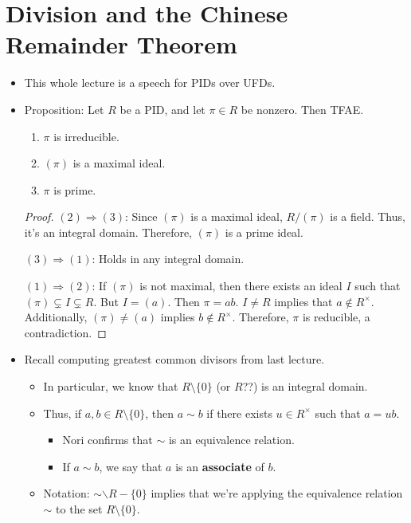 \documentclass[../notes.tex]{subfiles}
\begin{document}
\section{Division and the Chinese Remainder Theorem}
\begin{itemize}
    \item {}This whole lecture is a speech for PIDs over UFDs.
    \item Proposition: Let $R$ be a PID, and let $\pi\in R$ be nonzero. Then TFAE.
    \begin{enumerate}[label={(\arabic*)}]
        \item $\pi$ is irreducible.
        \item $(\pi)$ is a maximal ideal.
        \item $\pi$ is prime.
    \end{enumerate}
    \begin{proof}
        \underline{$(2)\Longrightarrow(3)$}: Since $(\pi)$ is a maximal ideal, $R/(\pi)$ is a field. Thus, it's an integral domain. Therefore, $(\pi)$ is a prime ideal.\par
        \underline{$(3)\Longrightarrow(1)$}: Holds in any integral domain.\par
        \underline{$(1)\Longrightarrow(2)$}: If $(\pi)$ is not maximal, then there exists an ideal $I$ such that $(\pi)\subsetneq I\subsetneq R$. But $I=(a)$. Then $\pi=ab$. $I\neq R$ implies that $a\notin R^\times$. Additionally, $(\pi)\neq(a)$ implies $b\notin R^\times$. Therefore, $\pi$ is reducible, a contradiction.
    \end{proof}
    \item Recall computing greatest common divisors from last lecture.
    \begin{itemize}
        \item In particular, we know that $R\setminus\{0\}$ (or $R$??) is an integral domain.
        \item Thus, if $a,b\in R\setminus\{0\}$, then $a\sim b$ if there exists $u\in R^\times$ such that $a=ub$.
        \begin{itemize}
            \item Nori confirms that $\sim$ is an equivalence relation.
            \item If $a\sim b$, we say that $a$ is an \textbf{associate} of $b$.
        \end{itemize}
        \item Notation: $\sim\backslash R-\{0\}$ implies that we're applying the equivalence relation $\sim$ to the set $R\setminus\{0\}$.

\end{itemize}
\end{itemize}
\end{document}
